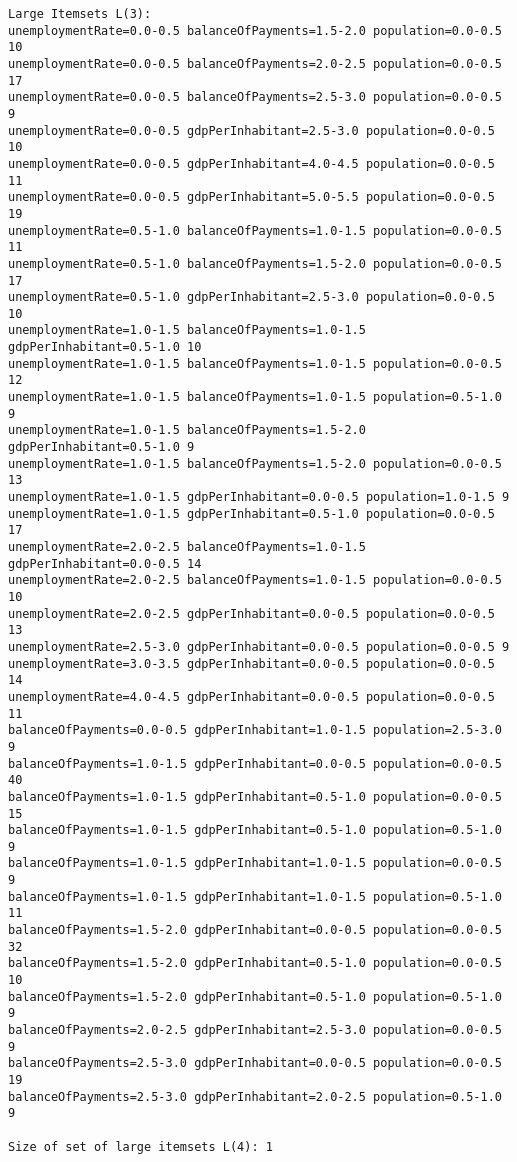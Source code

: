\begin{lstlisting}[basicstyle=\footnotesize\ttfamily,numbers=none]
Large Itemsets L(3):
unemploymentRate=0.0-0.5 balanceOfPayments=1.5-2.0 population=0.0-0.5 10
unemploymentRate=0.0-0.5 balanceOfPayments=2.0-2.5 population=0.0-0.5 17
unemploymentRate=0.0-0.5 balanceOfPayments=2.5-3.0 population=0.0-0.5 9
unemploymentRate=0.0-0.5 gdpPerInhabitant=2.5-3.0 population=0.0-0.5 10
unemploymentRate=0.0-0.5 gdpPerInhabitant=4.0-4.5 population=0.0-0.5 11
unemploymentRate=0.0-0.5 gdpPerInhabitant=5.0-5.5 population=0.0-0.5 19
unemploymentRate=0.5-1.0 balanceOfPayments=1.0-1.5 population=0.0-0.5 11
unemploymentRate=0.5-1.0 balanceOfPayments=1.5-2.0 population=0.0-0.5 17
unemploymentRate=0.5-1.0 gdpPerInhabitant=2.5-3.0 population=0.0-0.5 10
unemploymentRate=1.0-1.5 balanceOfPayments=1.0-1.5 gdpPerInhabitant=0.5-1.0 10
unemploymentRate=1.0-1.5 balanceOfPayments=1.0-1.5 population=0.0-0.5 12
unemploymentRate=1.0-1.5 balanceOfPayments=1.0-1.5 population=0.5-1.0 9
unemploymentRate=1.0-1.5 balanceOfPayments=1.5-2.0 gdpPerInhabitant=0.5-1.0 9
unemploymentRate=1.0-1.5 balanceOfPayments=1.5-2.0 population=0.0-0.5 13
unemploymentRate=1.0-1.5 gdpPerInhabitant=0.0-0.5 population=1.0-1.5 9
unemploymentRate=1.0-1.5 gdpPerInhabitant=0.5-1.0 population=0.0-0.5 17
unemploymentRate=2.0-2.5 balanceOfPayments=1.0-1.5 gdpPerInhabitant=0.0-0.5 14
unemploymentRate=2.0-2.5 balanceOfPayments=1.0-1.5 population=0.0-0.5 10
unemploymentRate=2.0-2.5 gdpPerInhabitant=0.0-0.5 population=0.0-0.5 13
unemploymentRate=2.5-3.0 gdpPerInhabitant=0.0-0.5 population=0.0-0.5 9
unemploymentRate=3.0-3.5 gdpPerInhabitant=0.0-0.5 population=0.0-0.5 14
unemploymentRate=4.0-4.5 gdpPerInhabitant=0.0-0.5 population=0.0-0.5 11
balanceOfPayments=0.0-0.5 gdpPerInhabitant=1.0-1.5 population=2.5-3.0 9
balanceOfPayments=1.0-1.5 gdpPerInhabitant=0.0-0.5 population=0.0-0.5 40
balanceOfPayments=1.0-1.5 gdpPerInhabitant=0.5-1.0 population=0.0-0.5 15
balanceOfPayments=1.0-1.5 gdpPerInhabitant=0.5-1.0 population=0.5-1.0 9
balanceOfPayments=1.0-1.5 gdpPerInhabitant=1.0-1.5 population=0.0-0.5 9
balanceOfPayments=1.0-1.5 gdpPerInhabitant=1.0-1.5 population=0.5-1.0 11
balanceOfPayments=1.5-2.0 gdpPerInhabitant=0.0-0.5 population=0.0-0.5 32
balanceOfPayments=1.5-2.0 gdpPerInhabitant=0.5-1.0 population=0.0-0.5 10
balanceOfPayments=1.5-2.0 gdpPerInhabitant=0.5-1.0 population=0.5-1.0 9
balanceOfPayments=2.0-2.5 gdpPerInhabitant=2.5-3.0 population=0.0-0.5 9
balanceOfPayments=2.5-3.0 gdpPerInhabitant=0.0-0.5 population=0.0-0.5 19
balanceOfPayments=2.5-3.0 gdpPerInhabitant=2.0-2.5 population=0.5-1.0 9

Size of set of large itemsets L(4): 1


\end{lstlisting}
